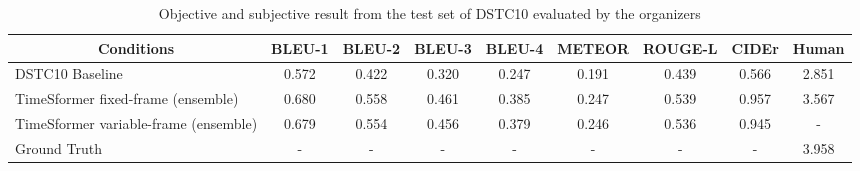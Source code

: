 \documentclass[letterpaper]{article} %
\begin{document}
\begin{table}[t]
  \centering
  \small
  \caption{Objective and subjective result from the test set of DSTC10 evaluated by the organizers}
  \label{tab:dstc10_result}
  \begin{tabular}{l|cccccccc}\hline
    \multicolumn{1}{c|}{Conditions} & BLEU-1 & BLEU-2 & BLEU-3 & BLEU-4 & METEOR & ROUGE-L & CIDEr & Human \\ \hline
    DSTC10 Baseline~\cite{Shah2021audio} & 0.572 & 0.422 & 0.320 & 0.247 & 0.191 & 0.439 & 0.566 & 2.851 \\
    TimeSformer fixed-frame (ensemble) & 0.680 & 0.558 & 0.461 & 0.385 & 0.247 & 0.539 & 0.957 & 3.567 \\
    TimeSformer variable-frame (ensemble) & 0.679 & 0.554 & 0.456 & 0.379 & 0.246 & 0.536 & 0.945 & - \\
    Ground Truth & - & - & - & - & - & - & - & 3.958 \\ \hline
  \end{tabular}
\end{table}
\end{document}
